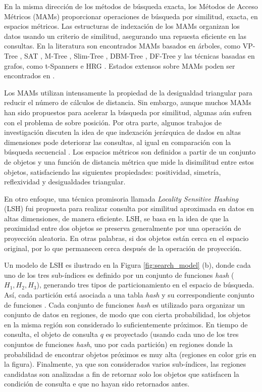 En la misma dirección de los métodos de búsqueda exacta, los Métodos de Acceso Métricos (MAMs) proporcionar operaciones de búsqueda por similitud, exacta, en espacios métricos. Las estructuras de indexación de los MAMs organizan los datos usando un criterio de similitud, asegurando una repuesta eficiente en las consultas. En la literatura son encontrados MAMs basados en árboles, como \mbox{VP-Tree} \cite{cit:vpt}, SAT \cite{SATree}, \mbox{M-Tree} \cite{MTree}, Slim-Tree \cite{SlimTree}, DBM-Tree \cite{DBMTree}, DF-Tree \cite{dftree} y las técnicas basadas en grafos, como \mbox{t-Spanners} \cite{cit:tspanners02} e HRG \cite{hrg}. Estados extensos sobre MAMs poden ser encontrados en \cite{cit:avez99searching, cit:indexDriven, cit:clarkson_nn_survey}.

Los MAMs utilizan intensamente la propiedad de la desigualdad triangular para reducir el número de cálculos de distancia. Sin embargo, aunque muchos MAMs han sido propuestos para acelerar la búsqueda por similitud, algunas aún sufren con el problema de sobre posición. Por otra parte, algunos trabajos de investigación discuten la idea de que indexación jerárquica de dados en altas dimensiones pode deteriorar las consultas, al igual en comparación con la búsqueda secuencial \cite{aleman_high_dimensional, WhatsWrong}. Los espacios métricos son definidos a partir de un conjunto de objetos y una función de distancia métrica que mide la disimilitud entre estos objetos, satisfaciendo las siguientes propiedades: positividad, simetría, reflexividad y desigualdades triangular.

En otro enfoque, una técnica promisoria llamada \textit{Locality Sensitive Hashing} (LSH) \cite{Datar2004} fui propuesta para realizar consulta por similitud aproximada en datos en altas dimensiones, de manera eficiente.  LSH, se basa en la idea de que la proximidad entre dos objetos se preserva generalmente por una operación de proyección aleatoria. En otras palabras, si dos objetos están cerca en el espacio original, por lo que permanecen cerca después de la operación de proyección.

Un modelo de  LSH es ilustrado en la Figura  \ref{fig:search_model} (b), donde cada uno de los tres sub-índices es definido por un conjunto de funciones \textit{hash} ($H_1, H_2, H_3$), generando tres tipos de particionamiento en el espacio de búsqueda. Así, cada partición está asociada a una tabla \textit{hash} y su correspondiente conjunto de funciones . Cada conjunto de funciones \textit{hash} es utilizado para organizar un conjunto de datos en regiones, de modo que con cierta probabilidad, los objetos en la misma región son considerado lo suficientemente próximos. En tiempo de consulta, el objeto de consulta $q$ es proyectado (usando cada uno de los tres conjuntos de funciones \textit{hash}, uno por cada partición) en regiones donde la probabilidad de encontrar objetos próximos es muy alta (regiones en color gris en la figura). Finalmente, ya que son considerados varios sub-índices, las regiones candidatas son analizadas a fin de retornar solo los objetos que satisfacen la condición de consulta e que no hayan sido retornados antes.


